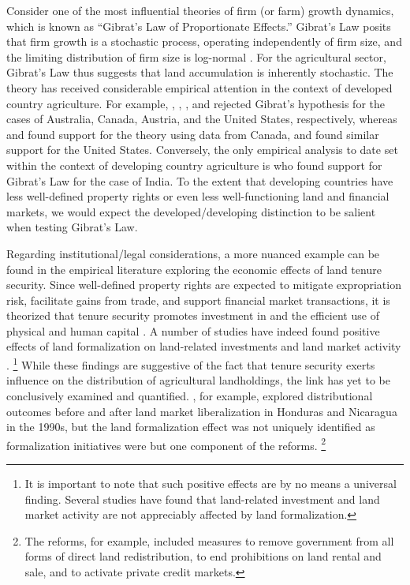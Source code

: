 \documentclass[english]{article}
\begin{document}
Consider one of the most influential theories of firm (or farm) growth 
dynamics, which is known as ``Gibrat's Law of Proportionate Effects.''
Gibrat's Law posits that firm growth is a stochastic process, operating 
independently of firm size, and the limiting distribution of firm size is 
log-normal \citep{gibrat1931, sutton1997}.
For the agricultural sector, Gibrat's Law thus suggests that land 
accumulation is inherently stochastic.
The theory has received considerable empirical attention in the context
of developed country agriculture.
For example, \citet{jarrett1968}, \citet{shapiro1987}, \citet{weiss1999}, 
and \citet{melhim2009a} rejected Gibrat's hypothesis for the cases of 
Australia, Canada, Austria, and the United States, respectively, whereas 
\citet{clark1992} and \citet{fulton1995} found support for the theory 
using data from Canada, and \citet{melhim2009b} found similar support 
for the United States.
Conversely, the only empirical analysis to date set within the context of 
developing country agriculture is \citet{shergill1991} who found support 
for Gibrat's Law for the case of India.
To the extent that developing countries have less well-defined property rights 
or even less well-functioning land and financial markets, we would expect 
the developed/developing distinction to be salient when testing Gibrat's Law.

Regarding institutional/legal considerations, a more nuanced example can be 
found in the empirical literature exploring the economic effects of land 
tenure security.
Since well-defined property rights are expected to mitigate expropriation risk, 
facilitate gains from trade, and support financial market transactions, it is 
theorized that tenure security promotes investment in and the efficient use 
of physical and human capital \citep{besley2010}.
A number of studies have indeed found positive effects of land formalization 
on land-related investments \citep{feder1988, besley1995, deininger2008} and 
land market activity \citep{deininger2003, boucher2005, deininger2008b}.%
\footnote{It is important to note that such positive effects are by no means
a universal finding. 
Several studies have found that land-related investment \citep{migot1991, 
gavian1996, brasselle2002} and land market activity \citep{deininger2005, 
gould2006, barnes2007} are not appreciably affected by land formalization.}
While these findings are suggestive of the fact that tenure security exerts 
influence on the distribution of agricultural landholdings, the link has yet 
to be conclusively examined and quantified.
\citet{boucher2005}, for example, explored distributional outcomes before 
and after land market liberalization in Honduras and Nicaragua in the 1990s, 
but the land formalization effect was not uniquely identified as formalization 
initiatives were but one component of the reforms.%
\footnote{The reforms, for example, included measures to remove 
government from all forms of direct land redistribution, to end 
prohibitions on land rental and sale, and to activate private credit markets.}
\end{document}
